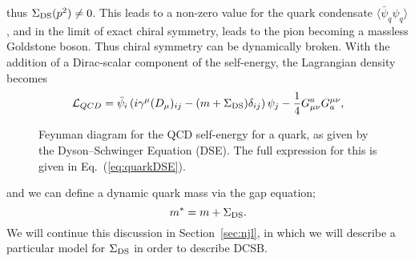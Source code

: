 \documentclass[11pt,a4paper,twoside]{carrollthesis}
\newcommand{\be}{\begin{equation}}
\newcommand{\ee}{\end{equation}}
\newcommand{\bra}{\langle}
\newcommand{\ket}{\rangle}
\newcommand{\reci}[1]{\frac{1}{#1}}
\begin{document}
thus $\Sigma_{\rm DS}(p^2) \neq 0$. This leads to a non-zero value for
the quark condensate $\bra\bar{\psi}_q\psi_q\ket$, and in the limit of
exact chiral symmetry, leads to the pion becoming a massless Goldstone
boson. Thus chiral symmetry can be dynamically broken. With the
addition of a Dirac-scalar component of the self-energy, the
Lagrangian density becomes
%
\be {\cal L}_{QCD} = \bar{\psi}_i\left(i\gamma^\mu (D_\mu)_{ij} - (m +
\Sigma_{\rm DS})\delta_{ij} \right) \psi_j -
\reci{4}G_{\mu\nu}^aG^{\mu\nu}_a, \ee
%
\vfill
%
\begin{figure}[!h]
\centering
\caption[Quark self-energy (DSE) in QCD]{Feynman diagram for the QCD
  self-energy for a quark, as given by the Dyson--Schwinger Equation
  (DSE). The full expression for this is given in
  Eq.~(\ref{eq:quarkDSE}). \protect\label{fig:quarkDSE}}
\end{figure}
%
\clearpage
%
and we can define a dynamic quark mass via the gap equation;
%
\be m^* = m + \Sigma_{\rm DS}. \ee
%
We will continue this discussion in Section~\ref{sec:njl}, in which we
will describe a particular model for $\Sigma_{\rm DS}$ in
order to describe DCSB.\par
%
\end{document}
